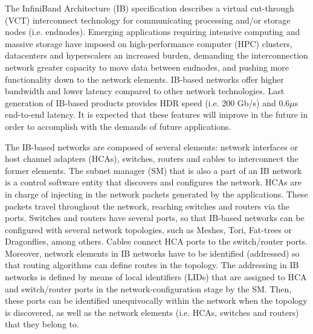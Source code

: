 \documentclass[review]{elsarticle}
\newcommand{\dflys}{Dragonflies}
\newcommand{\ib}{IB}
\newcommand{\ibl}{InfiniBand}
\begin{document}
The \ibl{} Architecture (\ib{}) specification \cite{IBA2015} describes a virtual cut-through (VCT) interconnect technology for communicating processing and/or storage nodes (i.e. endnodes).
Emerging applications requiring intensive computing and massive storage have imposed on high-performance computer (HPC) clusters, datacenters and hyperscalers an increased burden,
demanding the interconnection network greater capacity to move data between endnodes, and pushing more functionality down to the network elements.
\ib-based networks offer higher bandwidth and lower latency compared to other network technologies.
Last generation of \ib-based products provides HDR speed (i.e. 200 Gb/s) and 0.6$\mu$s end-to-end latency.
It is expected that these features will improve in the future \cite{iba_roadmap} in order to accomplish with the demands of future applications.

The \ib-based networks are composed of several elements: network interfaces or host channel adapters (HCAs), switches, routers and cables to interconnect the former elements.
The subnet manager (SM) that is also a part of an \ib{} network is a control software entity that discovers and configures the network.
HCAs are in charge of injecting in the network packets generated by the applications.
These packets travel throughout the network, reaching switches and routers via the ports.
Switches and routers have several ports, so that \ib-based networks can be configured with several network topologies, such as Meshes, Tori, Fat-trees or \dflys{}, among others.
Cables connect HCA ports to the switch/router ports.
Moreover, network elements in \ib{} networks have to be identified (addressed) so that routing algorithms can define routes in the topology.
The addressing in \ib{} networks is defined by means of local identifiers (LIDs) that are assigned to HCA and switch/router ports in the network-configuration stage by the SM.
Then, these ports can be identified unequivocally within the network when the topology is discovered, as well as the network elements (i.e. HCAs, switches and routers) that they belong to.
\end{document}
